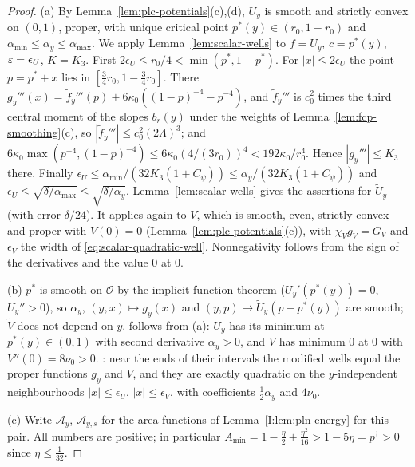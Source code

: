 \begin{proof}
(a) By Lemma~\ref{lem:plc-potentials}(c),(d), $U_y$ is smooth and strictly convex on $(0,1)$, proper, with unique
critical point $p^*(y)\in(r_0,1-r_0)$ and $\alpha_{\min}\le\alpha_y\le\alpha_{\max}$. We apply
Lemma~\ref{lem:scalar-wells} to $f=U_y$, $c=p^*(y)$, $\varepsilon=\epsilon_U$, $K=K_3$. First $2\epsilon_U\le r_0/4<\min(p^*,1-p^*)$.
For $|x|\le2\epsilon_U$ the point $p=p^*+x$ lies in $[\frac34r_0,1-\frac34r_0]$. There $g_y'''(x)=\tilde f_y'''(p)+
6\kappa_0((1-p)^{-4}-p^{-4})$, and $\tilde f_y'''$ is $c_0^2$ times the third central moment of the slopes $b_r(y)$ under
the weights of Lemma~\ref{lem:fcp-smoothing}(c), so $|\tilde f_y'''|\le c_0^2(2\Lambda)^3$; and
$6\kappa_0\max(p^{-4},(1-p)^{-4})\le6\kappa_0(4/(3r_0))^4<192\kappa_0/r_0^4$. Hence $|g_y'''|\le K_3$ there. Finally
$\epsilon_U\le\alpha_{\min}/(32K_3(1+C_\psi))\le\alpha_y/(32K_3(1+C_\psi))$ and $\epsilon_U\le\sqrt{\delta/\alpha_{\max}}\le
\sqrt{\delta/\alpha_y}$. Lemma~\ref{lem:scalar-wells} gives the assertions for $\widetilde U_y$ (with error $\delta/24$).
It applies again to $V$, which is smooth, even, strictly convex and proper with $V(0)=0$ (Lemma~\ref{lem:plc-potentials}(c)),
with $\chi_Vg_V=G_V$ and $\epsilon_V$ the width of \eqref{eq:scalar-quadratic-well}. Nonnegativity follows from the
sign of the derivatives and the value $0$ at $0$.

(b) $p^*$ is smooth on $\mathcal O$ by the implicit function theorem ($U_y'(p^*(y))=0$, $U_y''>0$), so $\alpha_y$,
$(y,x)\mapsto g_y(x)$ and $(y,p)\mapsto\widetilde U_y(p-p^*(y))$ are smooth; $\widetilde V$ does not depend on $y$.
 follows from (a): $U_y$ has its minimum at $p^*(y)\in(0,1)$ with second derivative $\alpha_y>0$, and
$V$ has minimum $0$ at $0$ with $V''(0)=8\nu_0>0$. : near the ends of their intervals the modified
wells equal the proper functions $g_y$ and $V$, and they are exactly quadratic on the $y$-independent neighbourhoods
$|x|\le\epsilon_U$, $|x|\le\epsilon_V$, with coefficients $\frac12\alpha_y$ and $4\nu_0$.

(c) Write $\mathcal A_y$, $\mathcal A_{y,s}$ for the area functions of Lemma~\ref{I:lem:pln-energy} for this pair. All
numbers are positive; in particular $A_{\min}=1-\frac\eta2+\frac{\eta^2}{16}>1-5\eta=p^\dagger>0$ since $\eta\le\frac1{32}$.


\end{proof}
